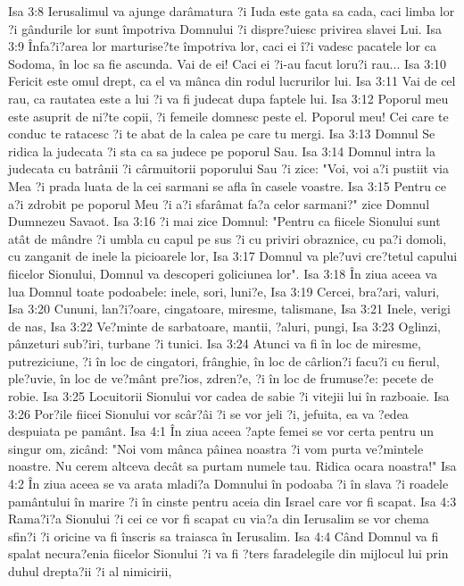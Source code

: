 Isa 3:8  Ierusalimul va ajunge darâmatura ?i Iuda este gata sa cada, caci limba lor ?i gândurile lor sunt împotriva Domnului ?i dispre?uiesc privirea slavei Lui.
Isa 3:9  Înfa?i?area lor marturise?te împotriva lor, caci ei î?i vadesc pacatele lor ca Sodoma, în loc sa fie ascunda. Vai de ei! Caci ei ?i-au facut loru?i rau...
Isa 3:10  Fericit este omul drept, ca el va mânca din rodul lucrurilor lui.
Isa 3:11  Vai de cel rau, ca rautatea este a lui ?i va fi judecat dupa faptele lui.
Isa 3:12  Poporul meu este asuprit de ni?te copii, ?i femeile domnesc peste el. Poporul meu! Cei care te conduc te ratacesc ?i te abat de la calea pe care tu mergi.
Isa 3:13  Domnul Se ridica la judecata ?i sta ca sa judece pe poporul Sau.
Isa 3:14  Domnul intra la judecata cu batrânii ?i cârmuitorii poporului Sau ?i zice: "Voi, voi a?i pustiit via Mea ?i prada luata de la cei sarmani se afla în casele voastre.
Isa 3:15  Pentru ce a?i zdrobit pe poporul Meu ?i a?i sfarâmat fa?a celor sarmani?" zice Domnul Dumnezeu Savaot.
Isa 3:16  ?i mai zice Domnul: "Pentru ca fiicele Sionului sunt atât de mândre ?i umbla cu capul pe sus ?i cu priviri obraznice, cu pa?i domoli, cu zanganit de inele la picioarele lor,
Isa 3:17  Domnul va ple?uvi cre?tetul capului fiicelor Sionului, Domnul va descoperi goliciunea lor".
Isa 3:18  În ziua aceea va lua Domnul toate podoabele: inele, sori, luni?e,
Isa 3:19  Cercei, bra?ari, valuri,
Isa 3:20  Cununi, lan?i?oare, cingatoare, miresme, talismane,
Isa 3:21  Inele, verigi de nas,
Isa 3:22  Ve?minte de sarbatoare, mantii, ?aluri, pungi,
Isa 3:23  Oglinzi, pânzeturi sub?iri, turbane ?i tunici.
Isa 3:24  Atunci va fi în loc de miresme, putreziciune, ?i în loc de cingatori, frânghie, în loc de cârlion?i facu?i cu fierul, ple?uvie, în loc de ve?mânt pre?ios, zdren?e, ?i în loc de frumuse?e: pecete de robie.
Isa 3:25  Locuitorii Sionului vor cadea de sabie ?i vitejii lui în razboaie.
Isa 3:26  Por?ile fiicei Sionului vor scâr?âi ?i se vor jeli ?i, jefuita, ea va ?edea despuiata pe pamânt.
Isa 4:1  În ziua aceea ?apte femei se vor certa pentru un singur om, zicând: "Noi vom mânca pâinea noastra ?i vom purta ve?mintele noastre. Nu cerem altceva decât sa purtam numele tau. Ridica ocara noastra!"
Isa 4:2  În ziua aceea se va arata mladi?a Domnului în podoaba ?i în slava ?i roadele pamântului în marire ?i în cinste pentru aceia din Israel care vor fi scapat.
Isa 4:3  Rama?i?a Sionului ?i cei ce vor fi scapat cu via?a din Ierusalim se vor chema sfin?i ?i oricine va fi înscris sa traiasca în Ierusalim.
Isa 4:4  Când Domnul va fi spalat necura?enia fiicelor Sionului ?i va fi ?ters faradelegile din mijlocul lui prin duhul drepta?ii ?i al nimicirii,
